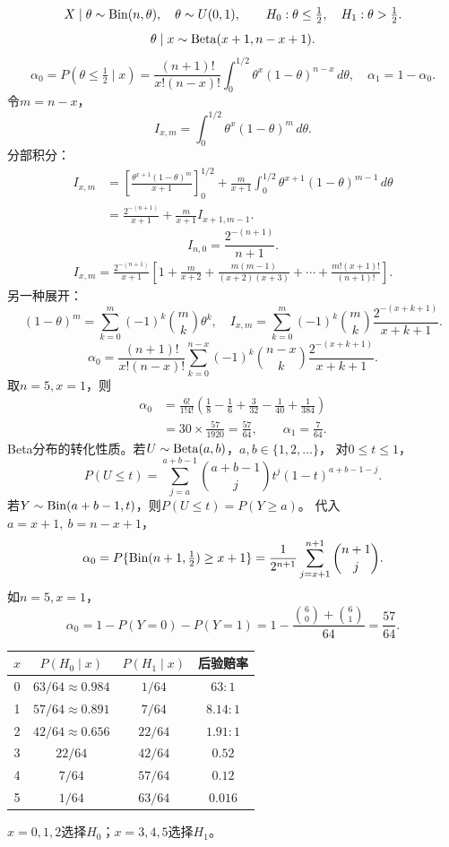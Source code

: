 \[
X\mid\theta\sim\operatorname{Bin}(n,\theta),\quad\theta\sim U(0,1),
\qquad H_0:\theta\leq\tfrac12,\quad H_1:\theta>\tfrac12.
\]
\[
\theta\mid x\sim\operatorname{Beta}(x+1,n-x+1).
\]
\[
\alpha_0=P(\theta\leq\tfrac12\mid x)
=\frac{(n+1)!}{x!(n-x)!}
\int_0^{1/2}\theta^x(1-\theta)^{n-x}\,d\theta,\quad\alpha_1=1-\alpha_0.
\]
令$m=n-x$，
\[
I_{x,m}=\int_0^{1/2}\theta^x(1-\theta)^m\,d\theta.
\]
分部积分：
\begin{align*}
I_{x,m}
&=\left[\frac{\theta^{x+1}(1-\theta)^m}{x+1}\right]_0^{1/2}
+\frac m{x+1}\int_0^{1/2}\theta^{x+1}(1-\theta)^{m-1}\,d\theta\\
&=\frac{2^{-(n+1)}}{x+1}+\frac m{x+1}I_{x+1,m-1}.
\end{align*}
\[
I_{n,0}=\frac{2^{-(n+1)}}{n+1}.
\]
\begin{align*}
I_{x,m}
=\frac{2^{-(n+1)}}{x+1}
\left[1+\frac m{x+2}
+\frac{m(m-1)}{(x+2)(x+3)}
+\cdots+\frac{m!(x+1)!}{(n+1)!}\right].
\end{align*}
另一种展开：
\[
(1-\theta)^m=\sum_{k=0}^m(-1)^k\binom mk\theta^k,
\quad
I_{x,m}=\sum_{k=0}^m(-1)^k\binom mk
\frac{2^{-(x+k+1)}}{x+k+1}.
\]
\[
\alpha_0=\frac{(n+1)!}{x!(n-x)!}
\sum_{k=0}^{n-x}(-1)^k\binom{n-x}{k}
\frac{2^{-(x+k+1)}}{x+k+1}.
\]
取$n=5,x=1$，则
\begin{align*}
\alpha_0
&=\frac{6!}{1!4!}
\left(\frac18-\frac16+\frac3{32}-\frac1{40}+\frac1{384}\right)\\
&=30\times\frac{57}{1920}=\frac{57}{64},\qquad
\alpha_1=\frac7{64}.
\end{align*}
Beta分布的转化性质。若$U\sim\operatorname{Beta}(a,b)$，$a,b\in\{1,2,\ldots\}$，
对$0\leq t\leq1$，
\[
P(U\leq t)=\sum_{j=a}^{a+b-1}\binom{a+b-1}{j}
t^j(1-t)^{a+b-1-j}.
\]
若$Y\sim\operatorname{Bin}(a+b-1,t)$，则$P(U\leq t)=P(Y\geq a)$。
代入$a=x+1,\ b=n-x+1$，
\[
\alpha_0=P\{\operatorname{Bin}(n+1,\tfrac12)\geq x+1\}
=\frac1{2^{n+1}}\sum_{j=x+1}^{n+1}\binom{n+1}{j}.
\]
如$n=5,x=1$，
\[
\alpha_0=1-P(Y=0)-P(Y=1)
=1-\frac{\binom60+\binom61}{64}=\frac{57}{64}.
\]
\begin{center}
\begin{tabular}{c c c c}\toprule
$x$&$P(H_0\mid x)$&$P(H_1\mid x)$&后验赔率\\\midrule
0&$63/64\approx0.984$&$1/64$&$63:1$\\
1&$57/64\approx0.891$&$7/64$&$8.14:1$\\
2&$42/64\approx0.656$&$22/64$&$1.91:1$\\
3&$22/64$&$42/64$&$0.52$\\
4&$7/64$&$57/64$&$0.12$\\
5&$1/64$&$63/64$&$0.016$\\\bottomrule
\end{tabular}
\end{center}
$x=0,1,2$选择$H_0$；$x=3,4,5$选择$H_1$。

